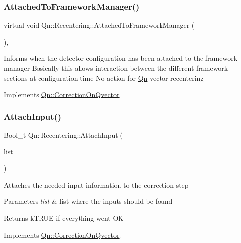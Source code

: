 \subsubsection{\texorpdfstring{Attached\+To\+Framework\+Manager()}{AttachedToFrameworkManager()}}
{\footnotesize\ttfamily virtual void Qn\+::\+Recentering\+::\+Attached\+To\+Framework\+Manager (\begin{DoxyParamCaption}{ }\end{DoxyParamCaption})\hspace{0.3cm}{\ttfamily [inline]}, {\ttfamily [virtual]}}

Informs when the detector configuration has been attached to the framework manager Basically this allows interaction between the different framework sections at configuration time No action for \mbox{\hyperlink{namespaceQn}{Qn}} vector recentering 

Implements \mbox{\hyperlink{classQn_1_1CorrectionOnQvector_ad2d37eb35973c854c7ffa3560a97d510}{Qn\+::\+Correction\+On\+Qvector}}.

\mbox{\label{classQn_1_1Recentering_ae931dc184caefa05392992a15ae5b53f}} 
\subsubsection{\texorpdfstring{Attach\+Input()}{AttachInput()}}
{\footnotesize\ttfamily Bool\+\_\+t Qn\+::\+Recentering\+::\+Attach\+Input (\begin{DoxyParamCaption}\item[{T\+List $\ast$}]{list }\end{DoxyParamCaption})\hspace{0.3cm}{\ttfamily [virtual]}}

Attaches the needed input information to the correction step 
\begin{DoxyParams}{Parameters}
{\em list} & list where the inputs should be found \\
\hline
\end{DoxyParams}
\begin{DoxyReturn}{Returns}
k\+T\+R\+UE if everything went OK 
\end{DoxyReturn}


Implements \mbox{\hyperlink{classQn_1_1CorrectionOnQvector_acb7165c2eb071517fa977484bee7e445}{Qn\+::\+Correction\+On\+Qvector}}.

